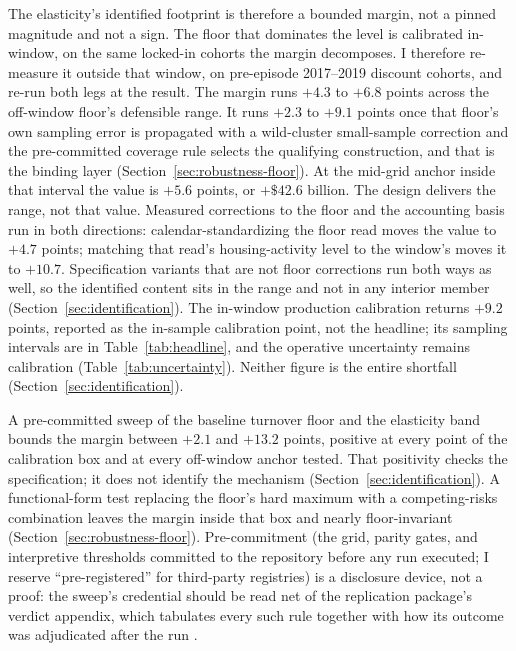 \documentclass[12pt]{article}
\begin{document}
The elasticity's identified footprint is therefore a bounded margin, not a pinned magnitude and not a sign. The floor that dominates the level is calibrated in-window, on the same locked-in cohorts the margin decomposes. I therefore re-measure it outside that window, on pre-episode 2017--2019 discount cohorts, and re-run both legs at the result. The margin runs $+4.3$ to $+6.8$ points across the off-window floor's defensible range. It runs $+2.3$ to $+9.1$ points once that floor's own sampling error is propagated with a wild-cluster small-sample correction and the pre-committed coverage rule selects the qualifying construction, and that is the binding layer (Section~\ref{sec:robustness-floor}). At the mid-grid anchor inside that interval the value is $+5.6$ points, or $+\$42.6$ billion. The design delivers the range, not that value. Measured corrections to the floor and the accounting basis run in both directions: calendar-standardizing the floor read moves the value to $+4.7$ points; matching that read's housing-activity level to the window's moves it to $+10.7$. Specification variants that are not floor corrections run both ways as well, so the identified content sits in the range and not in any interior member (Section~\ref{sec:identification}). The in-window production calibration returns $+9.2$ points, reported as the in-sample calibration point, not the headline; its sampling intervals are in Table~\ref{tab:headline}, and the operative uncertainty remains calibration (Table~\ref{tab:uncertainty}). Neither figure is the entire shortfall (Section~\ref{sec:identification}).

A pre-committed sweep of the baseline turnover floor and the elasticity band bounds the margin between $+2.1$ and $+13.2$ points, positive at every point of the calibration box and at every off-window anchor tested. That positivity checks the specification; it does not identify the mechanism (Section~\ref{sec:identification}). A functional-form test replacing the floor's hard maximum with a competing-risks combination leaves the margin inside that box and nearly floor-invariant (Section~\ref{sec:robustness-floor}). Pre-commitment (the grid, parity gates, and interpretive thresholds committed to the repository before any run executed; I reserve ``pre-registered'' for third-party registries) is a disclosure device, not a proof: the sweep's credential should be read net of the replication package's verdict appendix, which tabulates every such rule together with how its outcome was adjudicated after the run \citep{olken2015}.
\end{document}
